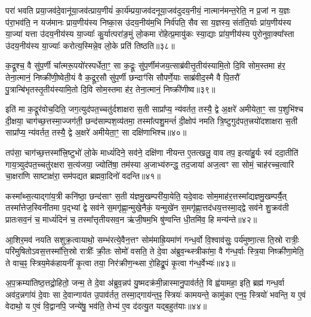 परा॑ भवति प्रया॒जव॑दे॒वानू॑या॒जव॑त्प्राय॒णीयं॑ का॒र्य॑म्प्रया॒जव॑दनूया॒जव॑दुदय॒नीयं॒ नात्मान॑मन्त॒रेति॒ न प्र॒जां न य॒ज्ञः प॑रा॒भव॑ति॒ न यज॑मानः प्राय॒णीय॑स्य निष्का॒स उ॑दय॒नीय॑म॒भि निर्व॑पति॒ सैव सा य॒ज्ञस्य॒ संत॑ति॒र्याः प्रा॑य॒णीय॑स्य या॒ज्या॑ यत्ता उ॑दय॒नीय॑स्य या॒ज्याः᳚ कु॒र्यात्परा॑ङ॒मुं लो॒कमा रो॑हेत्प्र॒मायु॑कः स्या॒द्याः प्रा॑य॒णीय॑स्य पुरोनुवा॒क्या᳚स्ता उ॑दय॒नीय॑स्य या॒ज्याः᳚ करोत्य॒स्मिन्ने॒व लो॒के प्रति॑ तिष्ठति॥३८॥

{\anuvakamend[{प्रज्ञा᳚त्यै पश्यत्यनूया॒जव॒द्यज॑मा॒नो\-ऽनु॑ पुरोनुवा॒क्या᳚स्ता अ॒ष्टौ च॑॥५॥}]}

क॒द्रूश्च॒ वै सु॑प॒र्णी चा᳚त्मरू॒पयो॑रस्पर्धेता॒ꣳ॒ सा क॒द्रूः सु॑प॒र्णीम॑जय॒त्साब्र॑वीत्तृ॒तीय॑स्यामि॒तो दि॒वि सोम॒स्तमा ह॑र॒ तेना॒त्मानं॒ निष्क्री॑णी॒ष्वेती॒यं वै क॒द्रूर॒सौ सु॑प॒र्णी छन्दाꣳ॑सि सौपर्णे॒याः साब्र॑वीद॒स्मै वै पि॒तरौ॑ पु॒त्रान्बि॑भृतस्तृ॒तीय॑स्यामि॒तो दि॒वि सोम॒स्तमा ह॑र॒ तेना॒त्मानं॒ निष्क्री॑णीष्व॥३९॥

इति॑ मा क॒द्रूर॑वोच॒दिति॒ जग॒त्युद॑पत॒च्चतु॑र्दशाक्षरा स॒ती साप्रा᳚प्य॒ न्य॑वर्तत॒ तस्यै॒ द्वे अ॒क्षरे॑ अमीयेता॒ꣳ॒ सा प॒शुभि॑श्च दी॒क्षया॒ चाग॑च्छ॒त्तस्मा॒ज्जग॑ती॒ छन्द॑साम्पश॒व्य॑तमा॒ तस्मा᳚त्पशु॒मन्तं॑ दी॒क्षोप॑ नमति त्रि॒ष्टुगुद॑पत॒त्त्रयो॑दशाक्षरा स॒ती साप्रा᳚प्य॒ न्य॑वर्तत॒ तस्यै॒ द्वे अ॒क्षरे॑ अमीयेता॒ꣳ॒ सा दक्षि॑णाभिश्च॥४०॥

तप॑सा॒ चाग॑च्छ॒त्तस्मा᳚त्त्रि॒ष्टुभो॑ लो॒के माध्यं॑दिने॒ सव॑ने॒ दक्षि॑णा नीयन्त ए॒तत्खलु॒ वाव तप॒ इत्या॑हु॒र्यः स्वं ददा॒तीति॑ गाय॒त्र्युद॑पत॒च्चतु॑रक्षरा स॒त्य॑जया॒ ज्योति॑षा॒ तम॑स्या अ॒जाभ्य॑रुन्द्ध॒ तद॒जाया॑ अज॒त्वꣳ सा सोमं॒ चाह॑रच्च॒त्वारि॑ चा॒क्षरा॑णि साष्टाक्ष॑रा॒ सम॑पद्यत ब्रह्मवा॒दिनो॑ वदन्ति॥४१॥

कस्मा᳚थ्स॒त्याद्गा॑य॒त्री कनि॑ष्ठा॒ छन्द॑साꣳ स॒ती य॑ज्ञमु॒खम्परी॑या॒येति॒ यदे॒वादः सोम॒माह॑र॒त्तस्मा᳚द्यज्ञमु॒खम्पर्यै॒त् तस्मा᳚त्तेज॒स्विनी॑तमा प॒द्भ्यां द्वे सव॑ने स॒मगृ॑ह्णा॒न्मुखे॒नैकं॒ यन्मुखे॑न स॒मगृ॑ह्णा॒त्तद॑धय॒त्तस्मा॒द्द्वे सव॑ने शु॒क्रव॑ती प्रातःसव॒नं च॒ माध्यं॑दिनं च॒ तस्मा᳚त्तृतीयसव॒न ऋ॑जी॒षम॒भि षु॑ण्वन्ति धी॒तमि॑व॒ हि मन्य॑न्ते॥४२॥

आ॒शिर॒मव॑ नयति सशुक्र॒त्वायाथो॒ सम्भ॑रत्ये॒वैन॒त्तꣳ सोम॑माह्रि॒यमा॑णं गन्ध॒र्वो वि॒श्वाव॑सुः॒ पर्य॑मुष्णा॒त्स ति॒स्रो रात्रीः॒ परि॑मुषितो\-ऽवस॒त्तस्मा᳚त्ति॒स्रो रात्रीः᳚ क्री॒तः सोमो॑ वसति॒ ते दे॒वा अ॑ब्रुव॒न्थ्स्त्रीका॑मा॒ वै ग॑न्ध॒र्वाः स्त्रि॒या निष्क्री॑णा॒मेति॒ ते वाच॒ꣴ॒ स्त्रिय॒मेक॑हायनीं कृ॒त्वा तया॒ निर॑क्रीण॒न्थ्सा रो॒हिद्रू॒पं कृ॒त्वा ग॑न्ध॒र्वेभ्यः॑॥४३॥

अ॒प॒क्रम्या॑तिष्ठ॒त्तद्रो॒हितो॒ जन्म॒ ते दे॒वा अ॑ब्रुव॒न्नप॑ यु॒ष्मदक्र॑मी॒न्नास्मानु॒पाव॑र्तते॒ वि ह्व॑यामहा॒ इति॒ ब्रह्म॑ गन्ध॒र्वा अव॑द॒न्नगा॑यं दे॒वाः सा दे॒वान्गाय॑त उ॒पाव॑र्तत॒ तस्मा॒द्गाय॑न्त॒ꣴ॒ स्त्रियः॑ कामयन्ते॒ कामु॑का एन॒ꣴ॒ स्त्रियो॑ भवन्ति॒ य ए॒वं वेदाथो॒ य ए॒वं वि॒द्वानपि॒ जन्ये॑षु॒ भव॑ति॒ तेभ्य॑ ए॒व द॑दत्यु॒त यद्ब॒हुत॑याः॥४४॥

